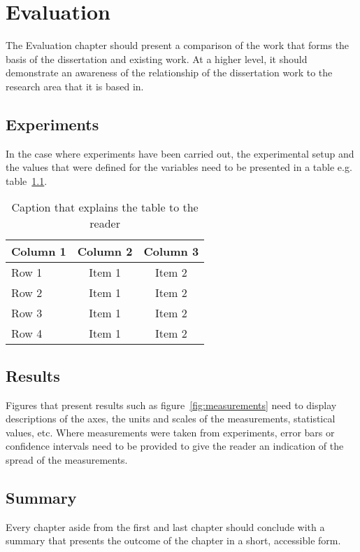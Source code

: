 \chapter{Evaluation}
\label{chap:Evaluation}

The Evaluation chapter should present a comparison of the work that forms the basis of the dissertation and existing work. At a higher level, it should demonstrate an awareness of the relationship of the dissertation work to the research area that it is based in.

\section{Experiments}

In the case where experiments have been carried out, the experimental setup and the values that were defined for the variables need to be presented in a table e.g. table~\ref{tab:experimentsetup}.

\begin{table}[!h]
\begin{center}
	\begin{tabular}{|l|c|c|} 
	\hline
 	\bf Column 1  & \bf Column 2  & \bf Column 3 \\
  	\hline
	Row 1 & Item 1 & Item 2 \\
	Row 2 & Item 1 & Item 2 \\
	Row 3 & Item 1 & Item 2 \\
	Row 4 & Item 1 & Item 2 \\
	\hline
	\end{tabular}
\end{center}
\caption[Variables of the experiment]{Caption that explains the table to the reader}	
\label{tab:experimentsetup}
\end{table}


\section{Results}

Figures that present results such as figure~\ref{fig:measurements} need to display descriptions of the axes, the units and scales of the measurements, statistical values, etc. Where measurements were taken from experiments, error bars or confidence intervals need to be provided to give the reader an indication of the spread of the measurements.



\section{Summary}

Every chapter aside from the first and last chapter should conclude with a summary that presents the outcome of the chapter in a short, accessible form. 
